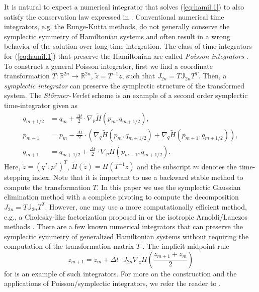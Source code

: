 It is natural to expect a numerical integrator that solves (\ref{eq:hamil.1}) to also satisfy the conservation law expressed in  . Conventional numerical time integrators, e.g. the Runge-Kutta methods, do not generally conserve the symplectic symmetry of Hamiltonian systems and often result in a wrong behavior of the solution over long time-integration. The class of time-integrators for (\ref{eq:hamil.1}) that preserve the Hamiltonian are called \emph{Poisson integrators} \cite{Hairer:1250576}. To construct a general Poisson integrator, first we find a coordinate transformation $T:\mathbb R^{2n}\to\mathbb R^{2n}$, $\tilde z = T^{-1}z$, such that $J_{2n} = T \mathbb J_{2n} T^T$. Then, a \emph{symplectic integrator} can preserve the symplectic structure of the transformed system. The \emph{St\"ormer-Verlet} scheme is an example of a second order symplectic time-integrator given as
\begin{equation} \label{eq:hamil.6}
	\begin{aligned}
	q_{m+1/2} &= q_m + \frac{\Delta t} 2 \cdot \nabla_p \tilde H(p_m,q_{m+1/2}), \\
	p_{m+1} &= p_m - \frac{\Delta t} 2  \cdot \left( \nabla_q \tilde H(p_m,q_{m+1/2}) + \nabla_{q} \tilde H(p_{m+1},q_{m+1/2}) \right), \\
	q_{m+1} &= q_{m+1/2} + \frac{\Delta t} 2  \cdot  \nabla_p \tilde H(p_{m+1},q_{m+1/2}).
	\end{aligned}
\end{equation}
Here, $\tilde z = (q^T,p^T)^T$, $\tilde H(\tilde z) = H(T^{-1}z)$ and the subscript $m$ denotes the time-stepping index. Note that it is important to use a backward stable method to compute the transformation $T$. In this paper we use the symplectic Gaussian elimination method with a complete pivoting to compute the decomposition $J_{2n} = T \mathbb J_{2n} T^T$. However, one may use a more computationally efficient method, e.g., a Cholesky-like factorization proposed in \cite{benner:chol} or the isotropic Arnoldi/Lanczos methods \cite{doi:10.1137/S1064827500366434}. There are a few known numerical integrators that can preserve the symplectic symmetry of generalized Hamiltonian systems without requiring the computation of the transformation matrix $T$ \cite{Hairer:1250576}. The implicit midpoint rule
\begin{equation} \label{eq:hamil.7}
	z_{m+1} = z_{m} + \Delta t \cdot J_{2n} \nabla_z H \left( \frac{z_{m+1} + z_m}{2} \right)
\end{equation}
for  is an example of such integrators. For more on the construction and the applications of Poisson/symplectic integrators, we refer the reader to \cite{Hairer:1250576}.


